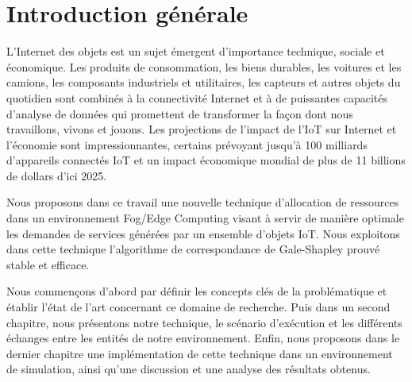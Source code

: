 \chapter{Introduction générale}
L'Internet des objets est un sujet émergent d'importance technique, sociale et économique. Les produits de consommation, les biens durables, les voitures et les camions, les composants industriels et utilitaires, les capteurs et autres objets du quotidien sont combinés à la connectivité Internet et à de puissantes capacités d'analyse de données qui promettent de transformer la façon dont nous travaillons, vivons et jouons. Les projections de l'impact de l'IoT sur Internet et l'économie sont impressionnantes, certains prévoyant jusqu'à 100 milliards d'appareils connectés IoT et un impact économique mondial de plus de 11 billions de dollars d'ici 2025.\par
Nous proposons dans ce travail une nouvelle technique d'allocation de ressources dans un environnement Fog/Edge Computing visant à servir de manière optimale les demandes de services générées par un ensemble d'objets IoT. Nous exploitons dans cette technique l'algorithme de correspondance de Gale-Shapley prouvé stable et efficace.\par
Nous commençons d'abord par définir les concepts clés de la problématique et établir l'état de l'art concernant ce domaine de recherche. Puis dans un second chapitre, nous présentons notre technique, le scénario d'exécution et les différents échanges entre les entités de notre environnement. Enfin, nous proposons dans le dernier chapitre une implémentation de cette technique dans un environnement de simulation, ainsi qu'une discussion et une analyse des résultats obtenus.